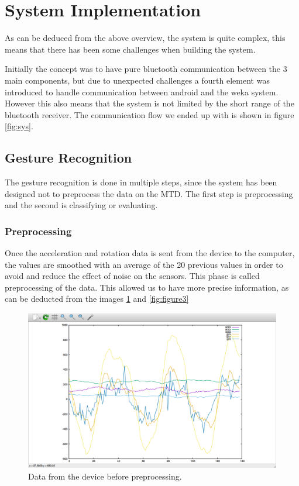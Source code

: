 \section{System Implementation} 
As can be deduced from the above overview, the system is quite complex,
this means that there has been some challenges when building the system.

Initially the concept was to have pure bluetooth communication between the 3 main components,
but due to unexpected challenges a fourth element was introduced to handle communication between android and the weka system. 
However this also means that the system is not limited by the short range of the bluetooth receiver.
The communication flow we ended up with is shown in figure \ref{fig:sys}.

\subsection{Gesture Recognition}
The gesture recognition is done in multiple steps, since the system has been designed not to preprocess the data on the MTD.
The first step is preprocessing and the second is classifying or evaluating.

\subsubsection{Preprocessing}
Once the acceleration and rotation data is sent from the device to the computer,
 the values are smoothed with an average of the 20 previous values in order to avoid and reduce the effect of noise on the sensors.
 This phase is called preprocessing of the data. 
 This allowed us to have more precise information, as can be deducted from the images  \ref{fig:figure2} and \ref{fig:figure3}

\begin{figure}[h]
\centering
\includegraphics[width=1\columnwidth]{img/raw}
\caption{Data from the device before preprocessing.}
\label{fig:figure2}
\end{figure}

